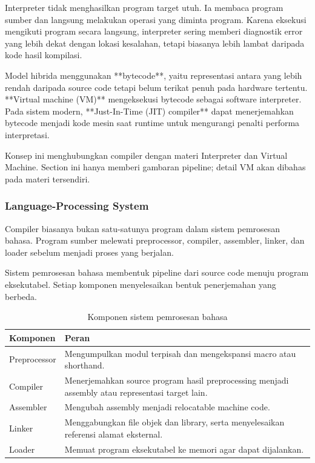 Interpreter tidak menghasilkan program target utuh. Ia membaca program sumber dan langsung melakukan operasi yang diminta program. Karena eksekusi mengikuti program secara langsung, interpreter sering memberi diagnostik error yang lebih dekat dengan lokasi kesalahan, tetapi biasanya lebih lambat daripada kode hasil kompilasi.

Model hibrida menggunakan **bytecode**, yaitu representasi antara yang lebih rendah daripada source code tetapi belum terikat penuh pada hardware tertentu. **Virtual machine (VM)** mengeksekusi bytecode sebagai software interpreter. Pada sistem modern, **Just-In-Time (JIT) compiler** dapat menerjemahkan bytecode menjadi kode mesin saat runtime untuk mengurangi penalti performa interpretasi.

Konsep ini menghubungkan compiler dengan materi Interpreter dan Virtual Machine. Section ini hanya memberi gambaran pipeline; detail VM akan dibahas pada materi tersendiri.

\subsubsection{Language-Processing System}

\begin{jawab}
Compiler biasanya bukan satu-satunya program dalam sistem pemrosesan bahasa. Program sumber melewati preprocessor, compiler, assembler, linker, dan loader sebelum menjadi proses yang berjalan.
\end{jawab}

Sistem pemrosesan bahasa membentuk pipeline dari source code menuju program eksekutabel. Setiap komponen menyelesaikan bentuk penerjemahan yang berbeda.

\begin{table}[H]
\centering
\begin{tabularx}{\textwidth}{|L{0.24\textwidth}|X|}
\hline
\textbf{Komponen} & \textbf{Peran} \\
\hline
Preprocessor & Mengumpulkan modul terpisah dan mengekspansi macro atau shorthand. \\
\hline
Compiler & Menerjemahkan source program hasil preprocessing menjadi assembly atau representasi target lain. \\
\hline
Assembler & Mengubah assembly menjadi relocatable machine code. \\
\hline
Linker & Menggabungkan file objek dan library, serta menyelesaikan referensi alamat eksternal. \\
\hline
Loader & Memuat program eksekutabel ke memori agar dapat dijalankan. \\
\hline
\end{tabularx}
\caption{Komponen sistem pemrosesan bahasa}
\label{tab:language-processing-system}
\end{table}


